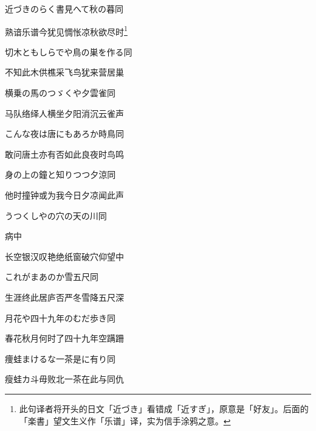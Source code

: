 \begin{haiku}
    {\FH 近づきのらく書見へて秋の暮}\hfill{\FH 同}

    {\FK 熟谙乐谱今犹见惆怅凉秋欲尽时\footnote{\FT 此句译者将开头的日文「近づき」看错成「近すぎ」，原意是「好友」。后面的「楽書」望文生义作「乐谱」译，实为信手涂鸦之意。}}
\end{haiku}

\begin{haiku}
    {\FH 切木ともしらでや鳥の巣を作る}\hfill{\FH 同}

    {\FK 不知此木供樵采飞鸟犹来营居巢}
\end{haiku}

\begin{haiku}
    {\FH 横乗の馬のつゞくや夕雲雀}\hfill{\FH 同}

    {\FK 马队络绎人横坐夕阳消沉云雀声}
\end{haiku}

\begin{haiku}
    {\FH こんな夜は唐にもあろか時鳥}\hfill{\FH 同}

    {\FK 敢问唐土亦有否如此良夜时鸟鸣}
\end{haiku}

\begin{haiku}
    {\FH 身の上の鐘と知りつつ夕涼}\hfill{\FH 同}

    {\FK 他时撞钟或为我今日夕凉闻此声}
\end{haiku}

\begin{haiku}
    {\FH うつくしやの穴の天の川}\hfill{\FH 同}

    {\FK 病中}

    {\FK 长空银汉叹艳绝纸窗破穴仰望中}
\end{haiku}

\begin{haiku}
    {\FH これがまあのか雪五尺}\hfill{\FH 同}

    {\FK 生涯终此居庐否严冬雪降五尺深}
\end{haiku}

\begin{haiku}
    {\FH 月花や四十九年のむだ歩き}\hfill{\FH 同}

    {\FK 春花秋月何时了四十九年空蹒跚}
\end{haiku}

\begin{haiku}
    {\FH 痩蛙まけるな一茶是に有り}\hfill{\FH 同}

    {\FK 瘦蛙カ斗毋败北一茶在此与同仇}
\end{haiku}

